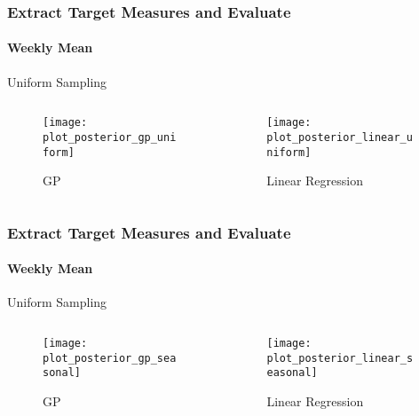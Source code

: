 \documentclass[
	8pt, %
]{beamer}
\begin{document}
\begin{frame}
	\frametitle{Extract Target Measures and Evaluate}
	\framesubtitle{Weekly Mean} %

	Uniform Sampling
	\begin{columns}[c] %
		\begin{column}{0.45\textwidth} %
				\begin{figure}
					\texttt{[image: plot\_posterior\_gp\_uniform]}
					\caption{GP}

				\end{figure}
		\end{column}
		\begin{column}{0.5\textwidth} %
				\begin{figure}
					\texttt{[image: plot\_posterior\_linear\_uniform]}
					\caption{Linear Regression}
				\end{figure}

		\end{column}
	\end{columns}



\end{frame}



\begin{frame}
	\frametitle{Extract Target Measures and Evaluate}
	\framesubtitle{Weekly Mean} %

	Uniform Sampling
	\begin{columns}[c] %
		\begin{column}{0.45\textwidth} %
				\begin{figure}
					\texttt{[image: plot\_posterior\_gp\_seasonal]}
					\caption{GP}

				\end{figure}
		\end{column}
		\begin{column}{0.5\textwidth} %
				\begin{figure}
					\texttt{[image: plot\_posterior\_linear\_seasonal]}
					\caption{Linear Regression}
				\end{figure}

		\end{column}
	\end{columns}

\end{frame}
\end{document}
